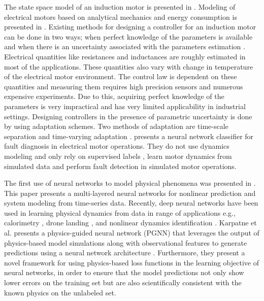 \documentclass[letterpaper]{article}
\begin{document}
The state space model of an induction motor is presented in \cite{jadot2009induct}. Modeling of electrical motors based on analytical mechanics and energy consumption is presented in \cite{jebai2014cdc}. Existing methods for designing a controller for an induction motor can be done in two ways; when perfect knowledge of the parameters is available \cite{espinoisa1994scl,espinosa1995tac,nicklasson1997tac} and when there is an uncertainty associated with the parameters estimation \cite{chan1990tie,stephan1992iasam,marino1999tac,marino2000tac}. Electrical quantities like resistances and inductances are roughly estimated in most of the applications. These quantities also vary with change in temperature of the electrical motor environment. The control law is dependent on these quantities and measuring them requires high precision sensors and numerous expensive experiments. Due to this, acquiring perfect knowledge of the parameters is very impractical and has very limited applicability in industrial settings. Designing controllers in the presence of parametric uncertainty is done by using adaptation schemes. Two methods of adaptation are time-scale separation and time-varying adaptation \cite{anderson1977tac,zhang2002tac,jadot2009induct}. \cite{silva2013fault} presents a neural network classifier for fault diagnosis in electrical motor operations. They do not use dynamics modeling and only rely on supervised labels \cite{murphey2006model}, learn motor dynamics from simulated data and perform fault detection in simulated motor operations.

The first use of neural networks to model physical phenomena was presented in \cite{levin1991nips}. This paper presents a multi-layered neural networks for nonlinear prediction and system modeling from time-series data. Recently, deep neural networks have been used in learning physical dynamics from data in range of applications e.g.,  calorimetry \cite{carminati2017nipsw}, drone landing \cite{shi2018neurallander}, and nonlinear dynamics identification \cite{lusch2017deep}. Karpatne et al. presents a physics-guided neural network (PGNN) that leverages the output of physics-based model simulations along with observational features to generate predictions using a neural network architecture \cite{karpatne2017nipsw}. Furthermore, they present a novel framework for using physics-based loss functions in the learning objective of neural networks, in order to ensure that the model predictions not only show lower errors on the training set but are also scientifically consistent with the known physics on the unlabeled set.
\end{document}
